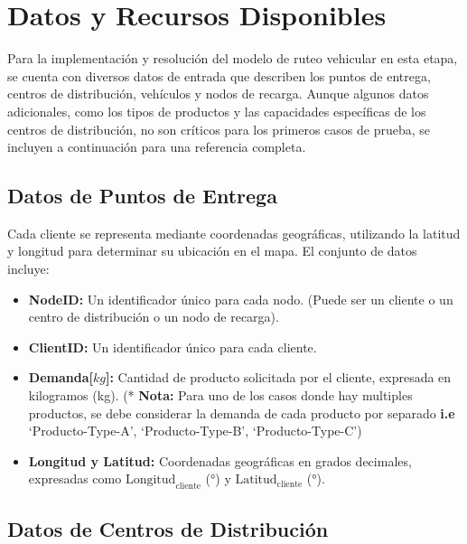 \documentclass[12pt]{article}
\begin{document}
\section{Datos y Recursos Disponibles}

Para la implementación y resolución del modelo de ruteo vehicular en esta etapa, se cuenta con diversos datos de entrada que describen los puntos de entrega, centros de distribución, vehículos y nodos de recarga. Aunque algunos datos adicionales, como los tipos de productos y las capacidades específicas de los centros de distribución, no son críticos para los primeros casos de prueba, se incluyen a continuación para una referencia completa.

\subsection{Datos de Puntos de Entrega}

Cada cliente se representa mediante coordenadas geográficas, utilizando la latitud y longitud para determinar su ubicación en el mapa. El conjunto de datos incluye:
\begin{itemize}
    \item \textbf{NodeID:} Un identificador único para cada nodo. (Puede ser un cliente o un centro de distribución o un nodo de recarga).
    \item \textbf{ClientID:} Un identificador único para cada cliente.
    \item \textbf{Demanda[$kg$]:} Cantidad de producto solicitada por el cliente, expresada en kilogramos (kg). (* \textbf{Nota:} Para uno de los casos donde hay multiples productos, se debe considerar la demanda de cada producto por separado \textbf{i.e} `Producto-Type-A', `Producto-Type-B', `Producto-Type-C')
    \item \textbf{Longitud y Latitud:} Coordenadas geográficas en grados decimales, expresadas como $\text{Longitud}_{\text{cliente}}$ (°) y $\text{Latitud}_{\text{cliente}}$ (°).
\end{itemize}

\subsection{Datos de Centros de Distribución}
\end{document}
